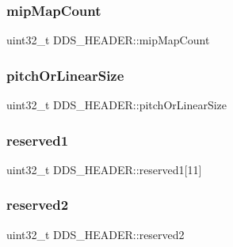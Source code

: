 \hypertarget{struct_d_d_s___h_e_a_d_e_r_a17b6d75171143338b022406db274cdb3}{}\label{struct_d_d_s___h_e_a_d_e_r_a17b6d75171143338b022406db274cdb3} 
\subsubsection{\texorpdfstring{mip\+Map\+Count}{mipMapCount}}
{\footnotesize\ttfamily uint32\+\_\+t D\+D\+S\+\_\+\+H\+E\+A\+D\+E\+R\+::mip\+Map\+Count}

\hypertarget{struct_d_d_s___h_e_a_d_e_r_a77410ea1d2209672fc6651b5322a9306}{}\label{struct_d_d_s___h_e_a_d_e_r_a77410ea1d2209672fc6651b5322a9306} 
\subsubsection{\texorpdfstring{pitch\+Or\+Linear\+Size}{pitchOrLinearSize}}
{\footnotesize\ttfamily uint32\+\_\+t D\+D\+S\+\_\+\+H\+E\+A\+D\+E\+R\+::pitch\+Or\+Linear\+Size}

\hypertarget{struct_d_d_s___h_e_a_d_e_r_a589e935e11a1d8193101741109710319}{}\label{struct_d_d_s___h_e_a_d_e_r_a589e935e11a1d8193101741109710319} 
\subsubsection{\texorpdfstring{reserved1}{reserved1}}
{\footnotesize\ttfamily uint32\+\_\+t D\+D\+S\+\_\+\+H\+E\+A\+D\+E\+R\+::reserved1\mbox{[}11\mbox{]}}

\hypertarget{struct_d_d_s___h_e_a_d_e_r_a2b94becd3bfcb64930551d3bb4387198}{}\label{struct_d_d_s___h_e_a_d_e_r_a2b94becd3bfcb64930551d3bb4387198} 
\subsubsection{\texorpdfstring{reserved2}{reserved2}}
{\footnotesize\ttfamily uint32\+\_\+t D\+D\+S\+\_\+\+H\+E\+A\+D\+E\+R\+::reserved2}

